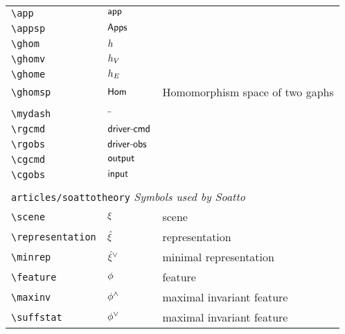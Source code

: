 \begin{longtable}{lll}
 {\color[rgb]{0.5,0.5,0.5}\texttt{\textbackslash app}} & $\mathsf{app}$ & \\ 
 {\color[rgb]{0.5,0.5,0.5}\texttt{\textbackslash appsp}} & $\mathsf{Apps}$ & \\ 
 {\color[rgb]{0.5,0.5,0.5}\texttt{\textbackslash ghom}} & $h$ & \\ 
 {\color[rgb]{0.5,0.5,0.5}\texttt{\textbackslash ghomv}} & $h_V$ & \\ 
 {\color[rgb]{0.5,0.5,0.5}\texttt{\textbackslash ghome}} & $h_E$ & \\ 
 {\color[rgb]{0.5,0.5,0.5}\texttt{\textbackslash ghomsp}} & $\mathsf{Hom}$ &  Homomorphism space of two gaphs\\ 
  &  & {\setlength\fboxsep{1pt}%
\fbox{%
\color[rgb]{0.5,0.5,0.5}\begin{minipage}[]{8cm}%
$\ghomsp(\cG,\rG)$\par%
{\small{\texttt{\$\textbackslash ghomsp(\textbackslash cG,\textbackslash rG)\$}}}\end{minipage}%
}%
}%
\\ 
 {\color[rgb]{0.5,0.5,0.5}\texttt{\textbackslash mydash}} & $\mydash$ & \\ 
 {\color[rgb]{0.5,0.5,0.5}\texttt{\textbackslash rgcmd}} & $\rgcmd$ & \\ 
 {\color[rgb]{0.5,0.5,0.5}\texttt{\textbackslash rgobs}} & $\rgobs$ & \\ 
 {\color[rgb]{0.5,0.5,0.5}\texttt{\textbackslash cgcmd}} & $\mathsf{output}$ & \\ 
 {\color[rgb]{0.5,0.5,0.5}\texttt{\textbackslash cgobs}} & $\mathsf{input}$ & \\ 
  &  & \\ 
 \multicolumn{3}{l}{{\color[rgb]{0.5,0.5,0.5}\texttt{articles/soattotheory}} \emph{Symbols used by Soatto}}\\ 
 \hline
{\color[rgb]{0.5,0.5,0.5}\texttt{\textbackslash scene}} & $\xi$ &  scene\\ 
 {\color[rgb]{0.5,0.5,0.5}\texttt{\textbackslash representation}} & $\hat{\xi}$ &  representation\\ 
 {\color[rgb]{0.5,0.5,0.5}\texttt{\textbackslash minrep}} & ${\hat{\xi}}^{\vee}$ &  minimal representation\\ 
 {\color[rgb]{0.5,0.5,0.5}\texttt{\textbackslash feature}} & $\phi$ &  feature\\ 
 {\color[rgb]{0.5,0.5,0.5}\texttt{\textbackslash maxinv}} & $\phi^{\wedge}$ &  maximal invariant feature\\ 
 {\color[rgb]{0.5,0.5,0.5}\texttt{\textbackslash suffstat}} & $\phi^{\vee}$ &  maximal invariant feature\\ 

\end{longtable}
